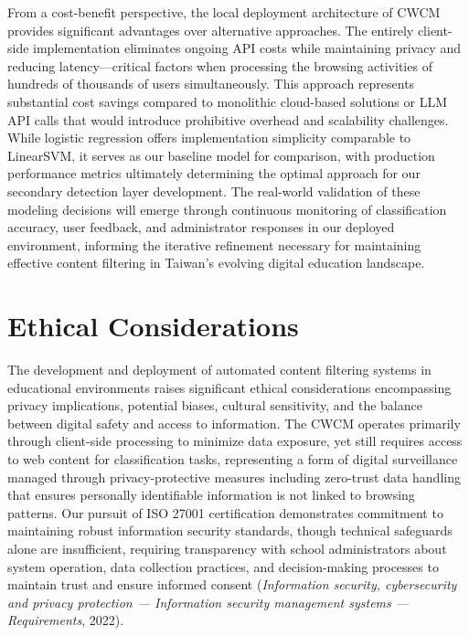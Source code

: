 \documentclass[
  titlepage]{article}
\begin{document}
From a cost-benefit perspective, the local deployment architecture of
CWCM provides significant advantages over alternative approaches. The
entirely client-side implementation eliminates ongoing API costs while
maintaining privacy and reducing latency---critical factors when
processing the browsing activities of hundreds of thousands of users
simultaneously. This approach represents substantial cost savings
compared to monolithic cloud-based solutions or LLM API calls that would
introduce prohibitive overhead and scalability challenges. While
logistic regression offers implementation simplicity comparable to
LinearSVM, it serves as our baseline model for comparison, with
production performance metrics ultimately determining the optimal
approach for our secondary detection layer development. The real-world
validation of these modeling decisions will emerge through continuous
monitoring of classification accuracy, user feedback, and administrator
responses in our deployed environment, informing the iterative
refinement necessary for maintaining effective content filtering in
Taiwan's evolving digital education landscape.

\section{Ethical Considerations}\label{ethical-considerations}

The development and deployment of automated content filtering systems in
educational environments raises significant ethical considerations
encompassing privacy implications, potential biases, cultural
sensitivity, and the balance between digital safety and access to
information. The CWCM operates primarily through client-side processing
to minimize data exposure, yet still requires access to web content for
classification tasks, representing a form of digital surveillance
managed through privacy-protective measures including zero-trust data
handling that ensures personally identifiable information is not linked
to browsing patterns. Our pursuit of ISO 27001 certification
demonstrates commitment to maintaining robust information security
standards, though technical safeguards alone are insufficient, requiring
transparency with school administrators about system operation, data
collection practices, and decision-making processes to maintain trust
and ensure informed consent (\emph{{Information security, cybersecurity
and privacy protection --- Information security management systems ---
Requirements}}, 2022).
\end{document}
